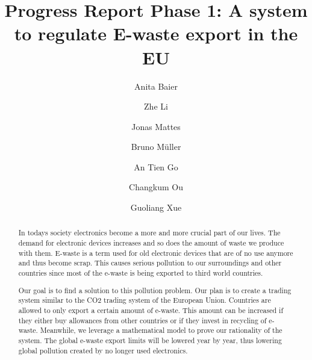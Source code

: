 \documentclass[sigchi-a, authorversion]{acmart}
\begin{document}
 
\title{Progress Report Phase 1: A system to regulate E-waste export in the EU}

\author{Anita Baier}

\author{Zhe Li}

\author{Jonas Mattes}

\author{Bruno M\"uller}

\author{An Tien Go}

\author{Changkum Ou}

\author{Guoliang Xue}




\begin{abstract}

In todays society electronics become a more and more crucial part of our lives. 
The demand for electronic devices increases and so does the amount of waste we produce with them. 
E-waste is a term used for old electronic devices that are of no use anymore and thus become scrap. 
This causes serious pollution to our surroundings and other countries since most of the e-waste is 
being exported to third world countries.

Our goal is to find a solution to this pollution problem. Our plan is to create a trading system similar 
to the CO2 trading system of the European Union. Countries are allowed to only export a certain amount of e-waste. 
This amount can be increased if they either buy allowances from other countries or if they invest in recycling of e-waste. 
Meanwhile, we leverage a mathematical model to prove our rationality of the system.
The global e-waste export limits will be lowered year by year, thus lowering global pollution created by no longer
used electronics.
  
\end{abstract}
\end{document}
